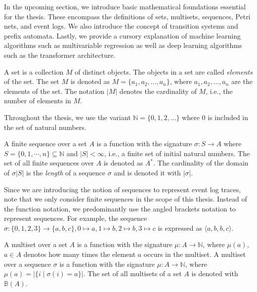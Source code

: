 
In the upcoming section, we introduce basic mathematical foundations essential for the thesis. These encompass the definitions of sets, multisets, sequences, Petri nets, and event logs. We also introduce the concept of transition systems and prefix automata. Lastly, we provide a cursory explanation of machine learning algorithms such as multivariable regression as well as deep learning algorithms such as the transformer architecture.

\begin{definition}[Set]
    A set is a collection $M$ of distinct objects. The objects in a set are called \emph{elements} of the set. The set $M$ is denoted as $M = \{ a_1, a_2, \dots, a_n \}$, where $a_1, a_2, \dots, a_n$ are the elements of the set. The notation $\lvert M \rvert$ denotes the cardinality of $M$, i.e., the number of elements in $M$.
\end{definition}

Throughout the thesis, we use the variant $\mathbb{N} = \{0, 1, 2, \dots\}$ where $0$ is included in the set of natural numbers.

\begin{definition}
    A finite sequence over a set $A$ is a function with the signature $\sigma \colon S \rightarrow A$ where $S = \{0, 1, \cdots, n \} \subseteq \mathbb{N}$ and $\lvert S \rvert < \infty$, i.e., a finite set of initial natural numbers. The set of all finite sequences over $A$ is denoted as $A^*$. The cardinality of the domain of $\sigma \lvert S \rvert$  is the \emph{length} of a sequence $\sigma$ and is denoted it with $\lvert \sigma \rvert$.
\end{definition}

Since we are introducing the notion of sequences to represent event log traces, note that we only consider finite sequences in the scope of this thesis. Instead of the function notation, we predominantly use the angled brackets notation to represent sequences. For example, the sequence $\sigma \colon \{0, 1, 2, 3\} \rightarrow \{a, b, c\}, 0 \mapsto a, 1 \mapsto b, 2 \mapsto b, 3 \mapsto c$ is expressed as $\langle a, b, b, c \rangle$.

\begin{definition}[Multiset]
    A multiset over a set $A$ is a function with the signature $\mu \colon A \rightarrow \mathbb{N}$, where $\mu(a)$, $a \in A$ denotes how many times the element $a$ occurs in the multiset.  
    A multiset over a sequence $\sigma$ is a function with the signature $\mu \colon A \rightarrow \mathbb{N}$, where $\mu(a) = \lvert \{ i \mid \sigma(i) = a \} \rvert$. The set of all multisets of a set $A$ is denoted with $\mathbb{B}(A)$.
\end{definition}

